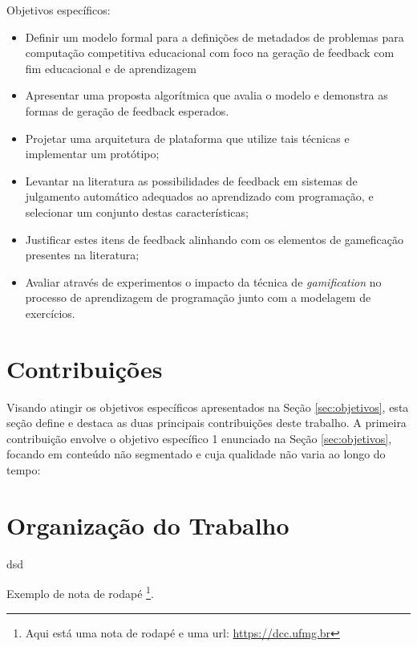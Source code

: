 Objetivos específicos:
\begin{itemize}
\item Definir um modelo formal para a definições de metadados de problemas para computação competitiva educacional com foco na geração de feedback com fim educacional e de aprendizagem

\item Apresentar uma proposta algorítmica que avalia o modelo e demonstra as formas de geração de feedback esperados.

\item Projetar uma arquitetura de plataforma que utilize tais técnicas e implementar um protótipo;

\item Levantar na literatura as possibilidades de feedback em sistemas de julgamento automático  adequados ao aprendizado com programação, e selecionar um conjunto destas características;

\item Justificar estes itens de feedback alinhando com os elementos de gameficação presentes na literatura;

\item Avaliar através de experimentos o impacto da técnica de \textit{gamification} no processo de aprendizagem de programação junto com a modelagem de exercícios.
\end{itemize}

        
\section{Contribuições}

    Visando atingir os objetivos específicos apresentados na Seção \ref{sec:objetivos}, esta seção define e destaca as duas principais contribuições deste trabalho. A primeira contribuição envolve o objetivo específico 1 enunciado na Seção \ref{sec:objetivos}, focando em conteúdo não segmentado e cuja qualidade não varia ao longo do tempo:
        
    \medskip\noindent {}\medskip

    \medskip\noindent {}\medskip
\section{Organização do Trabalho}
        dsd
               
Exemplo de nota de rodapé \footnote{Aqui está uma nota de rodapé e uma url: \url{https://dcc.ufmg.br}}.
	